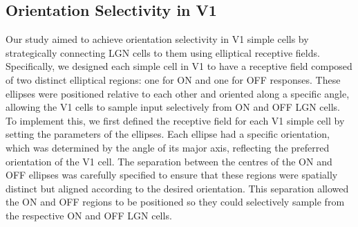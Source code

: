 \documentclass[12pt]{article}
\begin{document}
\subsection{Orientation Selectivity in V1}
Our study aimed to achieve orientation selectivity in V1 simple cells by strategically connecting LGN cells to them using elliptical receptive fields. Specifically, we designed each simple cell in V1 to have a receptive field composed of two distinct elliptical regions: one for ON and one for OFF responses. These ellipses were positioned relative to each other and oriented along a specific angle, allowing the V1 cells to sample input selectively from ON and OFF LGN cells. To implement this, we first defined the receptive field for each V1 simple cell by setting the parameters of the ellipses. Each ellipse had a specific orientation, which was determined by the angle of its major axis, reflecting the preferred orientation of the V1 cell. The separation between the centres of the ON and OFF ellipses was carefully specified to ensure that these regions were spatially distinct but aligned according to the desired orientation. This separation allowed the ON and OFF regions to be positioned so they could selectively sample from the respective ON and OFF LGN cells.
\end{document}
